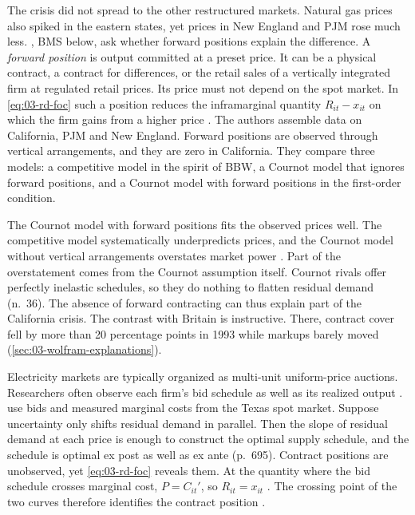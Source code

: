 The crisis did not spread to the other restructured markets. Natural gas prices also spiked in the eastern states, yet
prices in New England and PJM rose much less. \citet{BushnellMansurSaravia2008}, BMS below, ask whether forward positions explain
the difference. A \emph{forward position} is output committed at a preset price. It can be a physical contract, a
contract for differences, or the retail sales of a vertically integrated firm at regulated retail prices. Its price
must not depend on the spot market. In \eqref{eq:03-rd-foc} such a position reduces the inframarginal quantity
$R_{it} - x_{it}$ on which the firm gains from a higher price \citep{AllazVila1993}. The authors assemble data on
California, PJM and New England. Forward positions are observed through vertical arrangements, and they are zero in
California. They compare three models: a competitive model in the spirit of BBW, a Cournot model that ignores forward
positions, and a Cournot model with forward positions in the first-order condition.

The Cournot model with forward positions fits the observed prices well. The competitive model systematically
underpredicts prices, and the Cournot model without vertical arrangements overstates market power
\citep[pp.~694--695]{KelloggReguant2021}. Part of the overstatement comes from the Cournot assumption itself. Cournot
rivals offer perfectly inelastic schedules, so they do nothing to flatten residual demand (n.~36). The absence of
forward contracting can thus explain part of the California crisis. The contrast with Britain is instructive. There,
contract cover fell by more than 20 percentage points in 1993 while markups barely moved
(\cref{sec:03-wolfram-explanations}).

Electricity markets are typically organized as multi-unit uniform-price auctions. Researchers often observe each
firm's bid schedule as well as its realized output \citep[p.~695]{KelloggReguant2021}. \citet{HortacsuPuller2008} use bids and
measured marginal costs from the Texas spot market. Suppose uncertainty only shifts residual demand in parallel. Then
the slope of residual demand at each price is enough to construct the optimal supply schedule, and the schedule is
optimal ex post as well as ex ante (p.~695). Contract positions are unobserved, yet \eqref{eq:03-rd-foc} reveals
them. At the quantity where the bid schedule crosses marginal cost, $P = C_{it}'$, so $R_{it} = x_{it}$
\citep[p.~697]{KelloggReguant2021}. The crossing point of the two curves therefore identifies the contract position
\citep[p.~146, n.~24]{HortacsuPerrigne2021}.

